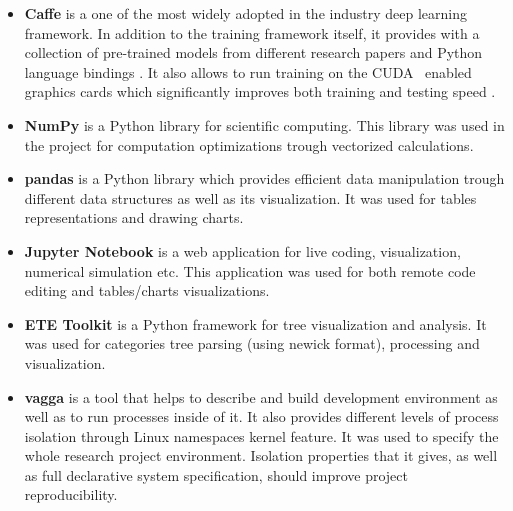 \begin{itemize}
    \item \textbf{Caffe} \cite{Caffe} is a one of the most widely adopted in the industry deep learning framework. In addition to the training framework itself, it provides with a collection of pre-trained models from different research papers \cite{CaffeModelZoo} and Python language bindings \cite{pycaffe}. It also allows to run training on the CUDA~\cite{CUDA} enabled graphics cards which significantly improves both training and testing speed \cite{Krizhevsky2012ImageNetDNN}.
    \item \textbf{NumPy} \cite{numpy} is a Python library for scientific computing. This library was used in the project for computation optimizations trough vectorized calculations.
    \item \textbf{pandas} \cite{pandas} is a Python library which provides efficient data manipulation trough different data structures as well as its visualization. It was used for tables representations and drawing charts.
    \item \textbf{Jupyter Notebook} \cite{jupyter} is a web application for live coding, visualization, numerical simulation etc. This application was used for both remote code editing and tables/charts visualizations.
    \item \textbf{ETE Toolkit} \cite{ete3} is a Python framework for tree visualization and analysis. It was used for categories tree parsing (using newick \cite{newick} format), processing and visualization.
    \item \textbf{vagga} \cite{vagga} is a tool that helps to describe and build development environment as well as to run processes inside of it. It also provides different levels of process isolation through Linux namespaces \cite{namespaces} kernel feature. It was used to specify the whole research project environment. Isolation properties that it gives, as well as full declarative system specification, should improve project reproducibility.
\end{itemize}
